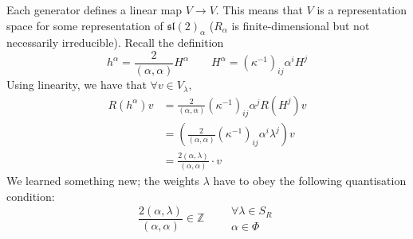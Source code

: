 Each generator defines a linear map $V \to V$.
This means that $V$ is a representation space for some representation of $\mathfrak{sl}(2)_\alpha$ ($R_\alpha$ is finite-dimensional but not necessarily  irreducible).
Recall the definition 
\begin{equation}
  h^\alpha = \frac{2}{(\alpha, \alpha)} H^\alpha \qquad H^\alpha = (\kappa^{-1})_{ij} \alpha^{i} H^{j}
\end{equation}
Using linearity, we have that $\forall v \in V_{\lambda}$,
\begin{align}
  R(h^{\alpha}) v &= \frac{2}{(\alpha, \alpha)} (\kappa^{-1})_{ij} \alpha^{j} R(H^{j}) v \\
						   &= \left( \frac{2}{(\alpha, \alpha)} (\kappa^{-1})_{ij} \alpha^{i} \lambda^{j} \right) v \\
						   &= \frac{2 (\alpha, \lambda)}{(\alpha, \alpha)} \cdot v
\end{align}
We learned something new; the weights $\lambda$ have to obey the following quantisation condition:
 \begin{equation}
  \label{eq:23}
   \boxed{\frac{2(\alpha, \lambda)}{(\alpha, \alpha)} \in \mathbb{Z} \qquad
    \begin{gathered}
      \forall \lambda \in S_R \\
      \alpha \in \Phi
    \end{gathered}}
\end{equation}

